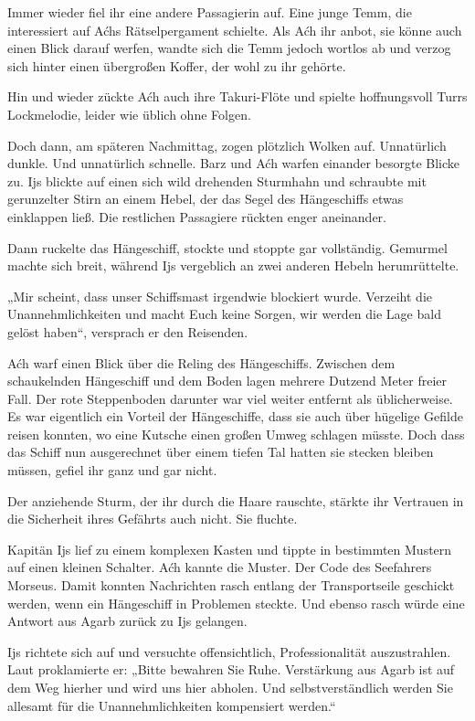 Immer wieder fiel ihr eine andere Passagierin auf. Eine junge Temm, die interessiert auf Aćhs Rätselpergament schielte. Als Aćh ihr anbot, sie könne auch einen Blick darauf werfen, wandte sich die Temm jedoch wortlos ab und verzog sich hinter einen übergroßen Koffer, der wohl zu ihr gehörte.

Hin und wieder zückte Aćh auch ihre Takuri-Flöte und spielte hoffnungsvoll Turrs Lockmelodie, leider wie üblich ohne Folgen.

Doch dann, am späteren Nachmittag, zogen plötzlich Wolken auf. Unnatürlich dunkle. Und unnatürlich schnelle. Barz und Aćh warfen einander besorgte Blicke zu. Ijs blickte auf einen sich wild drehenden Sturmhahn und schraubte mit gerunzelter Stirn an einem Hebel, der das Segel des Hängeschiffs etwas einklappen ließ. Die restlichen Passagiere rückten enger aneinander.

Dann ruckelte das Hängeschiff, stockte und stoppte gar vollständig. Gemurmel machte sich breit, während Ijs vergeblich an zwei anderen Hebeln herumrüttelte.

„Mir scheint, dass unser Schiffsmast irgendwie blockiert wurde. Verzeiht die Unannehmlichkeiten und macht Euch keine Sorgen, wir werden die Lage bald gelöst haben“, versprach er den Reisenden.

Aćh warf einen Blick über die Reling des Hängeschiffs. Zwischen dem schaukelnden Hängeschiff und dem Boden lagen mehrere Dutzend Meter freier Fall. Der rote Steppenboden darunter war viel weiter entfernt als üblicherweise. Es war eigentlich ein Vorteil der Hängeschiffe, dass sie auch über hügelige Gefilde reisen konnten, wo eine Kutsche einen großen Umweg schlagen müsste. Doch dass das Schiff nun ausgerechnet über einem tiefen Tal hatten sie stecken bleiben müssen, gefiel ihr ganz und gar nicht.

Der anziehende Sturm, der ihr durch die Haare rauschte, stärkte ihr Vertrauen in die Sicherheit ihres Gefährts auch nicht. Sie fluchte.

Kapitän Ijs lief zu einem komplexen Kasten und tippte in bestimmten Mustern auf einen kleinen Schalter. Aćh kannte die Muster. Der Code des Seefahrers Morseus. Damit konnten Nachrichten rasch entlang der Transportseile geschickt werden, wenn ein Hängeschiff in Problemen steckte. Und ebenso rasch würde eine Antwort aus Agarb zurück zu Ijs gelangen.

Ijs richtete sich auf und versuchte offensichtlich, Professionalität auszustrahlen. Laut proklamierte er: „Bitte bewahren Sie Ruhe. Verstärkung aus Agarb ist auf dem Weg hierher und wird uns hier abholen. Und selbstverständlich werden Sie allesamt für die Unannehmlichkeiten kompensiert werden.“

